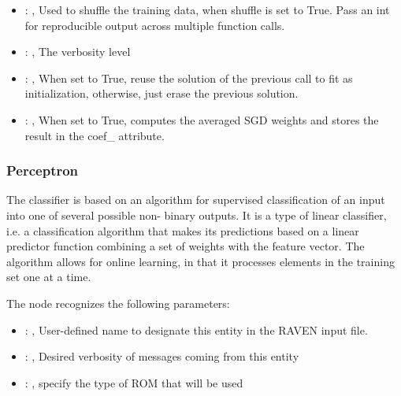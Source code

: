 \begin{itemize}
    \item {}: , 
      Used to shuffle the training data, when shuffle is set to
      True. Pass an int for reproducible output across multiple function calls.

    \item {}: , 
      The verbosity level

    \item {}: , 
      When set to True, reuse the solution of the previous call
      to fit as initialization, otherwise, just erase the previous solution.

    \item {}: , 
      When set to True, computes the averaged SGD weights and
      stores the result in the coef\_ attribute.
  \end{itemize}


\subsubsection{Perceptron}
  The  classifier is based on an                         algorithm for
  supervised classification of                         an input into one of several possible non-
  binary outputs.                         It is a type of linear classifier, i.e. a classification
  algorithm that makes                         its predictions based on a linear predictor function
  combining a set of weights                         with the feature vector.
  The algorithm allows for online learning, in that it processes elements in the
  training set one at a time.                         

  The  node recognizes the following parameters:
    \begin{itemize}
      \item {}: , 
        User-defined name to designate this entity in the RAVEN input file.
      \item {}: , 
        Desired verbosity of messages coming from this entity
      \item {}: , 
        specify the type of ROM that will be used
  \end{itemize}

